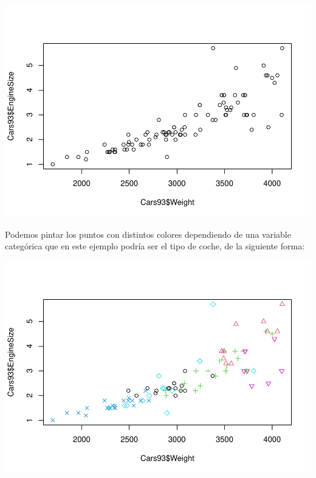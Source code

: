\documentclass[
]{book}
\newenvironment{Shaded}{\begin{snugshade}}{\end{snugshade}}
\newcommand{\AttributeTok}[1]{\textcolor[rgb]{0.77,0.63,0.00}{#1}}
\newcommand{\FunctionTok}[1]{\textcolor[rgb]{0.00,0.00,0.00}{#1}}
\newcommand{\NormalTok}[1]{#1}
\newcommand{\SpecialCharTok}[1]{\textcolor[rgb]{0.00,0.00,0.00}{#1}}
\begin{document}
\begin{Shaded}
\end{Shaded}

\includegraphics{fig/unnamed-chunk-88-1.pdf}

Podemos pintar los puntos con distintos colores dependiendo de una variable categórica que en este ejemplo podría ser el tipo de coche, de la siguiente forma:

\begin{Shaded}
\end{Shaded}

\includegraphics{fig/unnamed-chunk-89-1.pdf}
\end{document}
